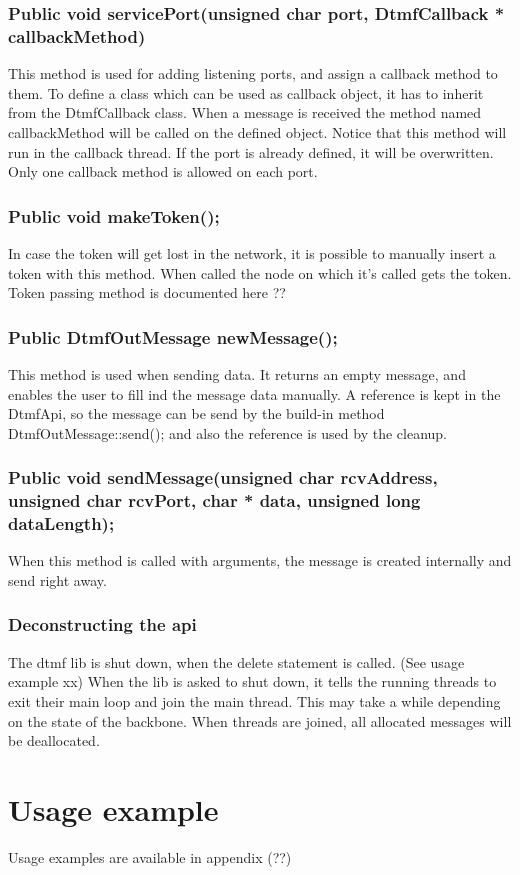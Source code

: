 \subsubsection*{Public void servicePort(unsigned char port, DtmfCallback * callbackMethod)}
This method is used for adding listening ports, and assign a callback method to them. To define a class which can be used as callback object, it has to inherit from the DtmfCallback class. When a message is received the method named callbackMethod will be called on the defined object. Notice that this method will run in the callback thread. If the port is already defined, it will be overwritten. Only one callback method is allowed on each port.

\subsubsection*{Public void makeToken();}
In case the token will get lost in the network, it is possible to manually insert a token with this method. When called the node on which it's called gets the token. Token passing method is documented here ??

\subsubsection*{Public DtmfOutMessage newMessage();}
This method is used when sending data. It returns an empty message, and enables the user to fill ind the message data manually. A reference is kept in the DtmfApi, so the message can be send by the build-in method DtmfOutMessage::send(); and also the reference is used by the cleanup.

\subsubsection*{Public void sendMessage(unsigned char rcvAddress, unsigned char rcvPort, char * data, unsigned long dataLength);}
When this method is called with arguments, the message is created internally and send right away.

\subsubsection*{Deconstructing the api}
The dtmf lib is shut down, when the delete statement is called. (See usage example xx) When the lib is asked to shut down, it tells the running threads to exit their main loop and join the main thread. This may take a while depending on the state of the backbone. When threads are joined, all allocated messages will be deallocated.
\section{Usage example}
Usage examples are available in appendix (??)

